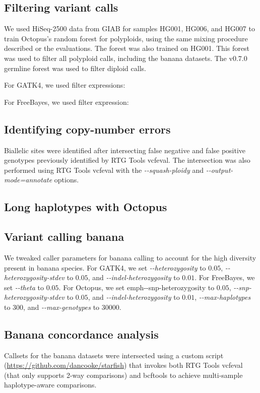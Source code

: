 \documentclass[notitlepage, twocolumn, 10pt]{article}
\begin{document}
\subsection*{Filtering variant calls} We used HiSeq-2500 data from GIAB for samples HG001, HG006, and HG007 to train Octopus's random forest for polyploids, using the same mixing procedure described or the evaluations. The forest was also trained on HG001. This forest was used to filter all polyploid calls, including the banana datasets. The v0.7.0 germline forest was used to filter diploid calls.

For GATK4, we used filter expressions:

For FreeBayes, we used filter expression:

\subsection*{Identifying copy-number errors} Biallelic sites were identified after intersecting false negative and false positive genotypes previously identified by RTG Tools vcfeval. The intersection was also performed using RTG Tools vcfeval with the \emph{-{}-squash-ploidy} and \emph{-{}-output-mode=annotate} options. 

\subsection*{Long haplotypes with Octopus} 

\subsection*{Variant calling banana} We tweaked caller parameters for banana calling to account for the high diversity present in banana species. For GATK4, we set \emph{-{}-heterozygosity} to $0.05$, \emph{-{}-heterozygosity-stdev} to $0.05$, and \emph{-{}-indel-heterozygosity} to $0.01$. For FreeBayes, we set \emph{-{}-theta} to $0.05$. For Octopus, we set emph{-{}-snp-heterozygosity} to $0.05$, \emph{-{}-snp-heterozygosity-stdev} to $0.05$, and \emph{-{}-indel-heterozygosity} to $0.01$, \emph{-{}-max-haplotypes} to $300$, and \emph{-{}-max-genotypes} to $30000$.

\subsection*{Banana concordance analysis} Callsets for the banana datasets were intersected using a custom script (\url{https://github.com/dancooke/starfish}) that invokes both RTG Tools vcfeval (that only supports 2-way comparisons) and bcftools to achieve multi-sample haplotype-aware comparisons.
\end{document}
